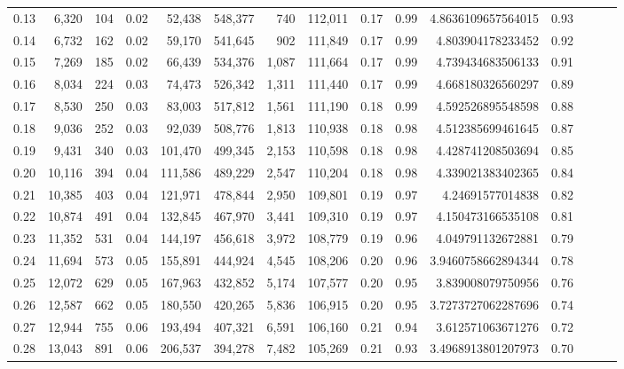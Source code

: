 \begin{tabular}{rrrrrrrrrrrrrrr}
0.13 &   6,320 &    104 &  0.02 &   52,438 &  548,377 &      740 &  112,011 &  0.17 &  0.99 &     4.8636109657564015 &      0.93 \\
0.14 &   6,732 &    162 &  0.02 &   59,170 &  541,645 &      902 &  111,849 &  0.17 &  0.99 &      4.803904178233452 &      0.92 \\
0.15 &   7,269 &    185 &  0.02 &   66,439 &  534,376 &    1,087 &  111,664 &  0.17 &  0.99 &      4.739434683506133 &      0.91 \\
0.16 &   8,034 &    224 &  0.03 &   74,473 &  526,342 &    1,311 &  111,440 &  0.17 &  0.99 &      4.668180326560297 &      0.89 \\
0.17 &   8,530 &    250 &  0.03 &   83,003 &  517,812 &    1,561 &  111,190 &  0.18 &  0.99 &      4.592526895548598 &      0.88 \\
0.18 &   9,036 &    252 &  0.03 &   92,039 &  508,776 &    1,813 &  110,938 &  0.18 &  0.98 &      4.512385699461645 &      0.87 \\
0.19 &   9,431 &    340 &  0.03 &  101,470 &  499,345 &    2,153 &  110,598 &  0.18 &  0.98 &      4.428741208503694 &      0.85 \\
0.20 &  10,116 &    394 &  0.04 &  111,586 &  489,229 &    2,547 &  110,204 &  0.18 &  0.98 &      4.339021383402365 &      0.84 \\
0.21 &  10,385 &    403 &  0.04 &  121,971 &  478,844 &    2,950 &  109,801 &  0.19 &  0.97 &       4.24691577014838 &      0.82 \\
0.22 &  10,874 &    491 &  0.04 &  132,845 &  467,970 &    3,441 &  109,310 &  0.19 &  0.97 &      4.150473166535108 &      0.81 \\
0.23 &  11,352 &    531 &  0.04 &  144,197 &  456,618 &    3,972 &  108,779 &  0.19 &  0.96 &      4.049791132672881 &      0.79 \\
0.24 &  11,694 &    573 &  0.05 &  155,891 &  444,924 &    4,545 &  108,206 &  0.20 &  0.96 &     3.9460758662894344 &      0.78 \\
0.25 &  12,072 &    629 &  0.05 &  167,963 &  432,852 &    5,174 &  107,577 &  0.20 &  0.95 &      3.839008079750956 &      0.76 \\
0.26 &  12,587 &    662 &  0.05 &  180,550 &  420,265 &    5,836 &  106,915 &  0.20 &  0.95 &     3.7273727062287696 &      0.74 \\
0.27 &  12,944 &    755 &  0.06 &  193,494 &  407,321 &    6,591 &  106,160 &  0.21 &  0.94 &      3.612571063671276 &      0.72 \\
0.28 &  13,043 &    891 &  0.06 &  206,537 &  394,278 &    7,482 &  105,269 &  0.21 &  0.93 &     3.4968913801207973 &      0.70 \\

\end{tabular}
